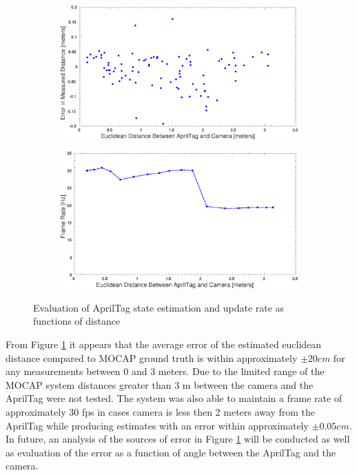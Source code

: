 \documentclass[11pt, twocolumn]{article}
\begin{document}
\begin{figure}	
	\centering
	\begin{subfigure}[b]{\linewidth}
		\includegraphics[width=\textwidth]{images/Apr_FPS_vs_Dist.eps}
		\caption{}
		
	\end{subfigure}

	\begin{subfigure}[b]{\linewidth}
		\includegraphics[width=\textwidth]{images/Apr_Distance_Error.eps}
		\caption{}
		
	\end{subfigure}
	\caption{Evaluation of AprilTag state estimation and update rate as functions of distance}
	\label{fig:AprilTag_eval}	
\end{figure}

From Figure \ref{fig:AprilTag_eval} it appears that the average error of the estimated euclidean distance compared to MOCAP ground truth is within approximately $\pm 20 cm$ for any measurements between 0 and 3 meters. Due to the limited range of the MOCAP system distances greater than 3 m between the camera and the AprilTag were not tested. The system was also able to maintain a frame rate of approximately 30 fps in cases camera is less then 2 meters away from the AprilTag while producing estimates with an error within approximately $\pm 0.05 cm$. In future, an analysis of the sources of error in Figure \ref{fig:AprilTag_eval} will be conducted as well as evaluation of the error as a function of angle between the AprilTag and the camera. 
\end{document}
